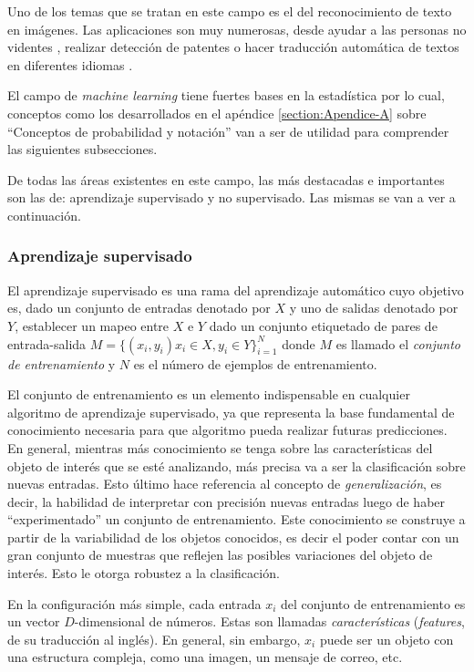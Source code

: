 	Uno de los temas que se tratan en este campo es el del reconocimiento de texto en imágenes. Las aplicaciones son muy numerosas, desde ayudar a las personas no videntes \cite{Optelec}, realizar detección de patentes \cite{DAB} o hacer traducción automática de textos en diferentes idiomas \cite{WordLens}.
	 
	 El campo de \textit{machine learning} tiene fuertes bases en la estadística por lo cual, conceptos como los desarrollados en el apéndice \ref{section:Apendice-A} sobre ``Conceptos de probabilidad y notación'' van a ser de utilidad para comprender las siguientes subsecciones.
	 
	 De todas las áreas existentes en este campo, las más destacadas e importantes son las de: aprendizaje supervisado y no supervisado. Las mismas se van a ver a continuación.
	 	
	\subsubsection{Aprendizaje supervisado}
	
	El aprendizaje supervisado es una rama del aprendizaje automático cuyo objetivo es, dado un conjunto de entradas denotado por $X$ y uno de salidas denotado por $Y$, establecer un mapeo entre $X$ e $Y$ dado un conjunto etiquetado de pares de entrada-salida $M=\{(x_i,y_i) x_i \in X, y_i \in Y \}^{N}_{i=1}$ donde $M$ es llamado el \textit{conjunto de entrenamiento} y $N$ es el número de ejemplos de entrenamiento.
	
	El conjunto de entrenamiento es un elemento indispensable en cualquier algoritmo de aprendizaje supervisado, ya que representa la base fundamental de conocimiento necesaria para que algoritmo pueda realizar futuras predicciones. En general, mientras más conocimiento se tenga sobre las características del objeto de interés que se esté analizando, más precisa va a ser la clasificación sobre nuevas entradas. Esto último hace referencia al concepto de \textit{generalización}, es decir, la habilidad de interpretar con precisión nuevas entradas luego de haber ``experimentado'' un conjunto de entrenamiento. Este conocimiento se construye a partir de la variabilidad de los objetos conocidos, es decir el poder contar con un gran conjunto de muestras que reflejen las posibles variaciones del objeto de interés. Esto le otorga robustez a la clasificación. 
	
	En la configuración más simple, cada entrada $x_i$ del conjunto de entrenamiento es un vector $D$-dimensional de números. Estas son llamadas \textit{características} (\textit{features}, de su traducción al inglés). En general, sin embargo, $x_i$ puede ser un objeto con una estructura compleja, como una imagen, un mensaje de correo, etc.
	
